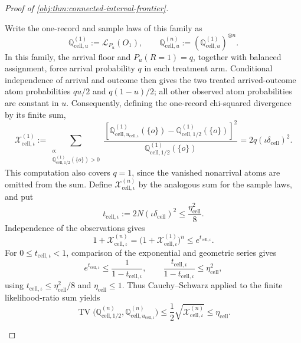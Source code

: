 \documentclass[11pt]{article}
\begin{document}
\begin{proof}[Proof of \cref{obj:thm:connected-interval-frontier}]
\begin{enumerate}
Write the one-record and sample laws of this family as
\[
\mathbb Q_{\mathrm{cell},u}^{(1)}:=\mathcal L_{P_u}(O_1),
\qquad
\mathbb Q_{\mathrm{cell},u}^{(n)}
:=(\mathbb Q_{\mathrm{cell},u}^{(1)})^{\otimes n}.
\]
In this family, the arrival floor and \(P_u(R=1)=q\), together with
balanced assignment, force arrival probability \(q\) in each treatment
arm. Conditional independence of arrival and outcome then gives the
two treated arrived-outcome atom probabilities \(qu/2\) and
\(q(1-u)/2\); all other observed atom probabilities are constant in \(u\).
Consequently, defining the one-record chi-squared divergence by its
finite sum,
\[
\mathcal X_{\mathrm{cell},\iota}^{(1)}
:=
\sum_{\substack{o:\\
\mathbb Q_{\mathrm{cell},1/2}^{(1)}(\{o\})>0}}
\frac{
\left[
\mathbb Q_{\mathrm{cell},u_{\mathrm{cell},\iota}}^{(1)}(\{o\})
-\mathbb Q_{\mathrm{cell},1/2}^{(1)}(\{o\})
\right]^2}
{\mathbb Q_{\mathrm{cell},1/2}^{(1)}(\{o\})}
=
2q(\iota\delta_{\mathrm{cell}})^2.
\]
This computation also covers \(q=1\), since the vanished nonarrival
atoms are omitted from the sum. Define
\(\mathcal X_{\mathrm{cell},\iota}^{(n)}\) by the analogous sum for the
sample laws, and put
\[
t_{\mathrm{cell},\iota}
:=2N(\iota\delta_{\mathrm{cell}})^2
\le\frac{\eta_{\mathrm{cell}}^2}{8}.
\]
Independence of the observations gives
\[
1+\mathcal X_{\mathrm{cell},\iota}^{(n)}
=
\bigl(1+\mathcal X_{\mathrm{cell},\iota}^{(1)}\bigr)^n
\le e^{t_{\mathrm{cell},\iota}}.
\]
For \(0\le t_{\mathrm{cell},\iota}<1\), comparison of the exponential
and geometric series gives
\[
e^{t_{\mathrm{cell},\iota}}
\le\frac1{1-t_{\mathrm{cell},\iota}},
\qquad
\frac{t_{\mathrm{cell},\iota}}{1-t_{\mathrm{cell},\iota}}
\le\eta_{\mathrm{cell}}^2,
\]
using \(t_{\mathrm{cell},\iota}\le\eta_{\mathrm{cell}}^2/8\) and
\(\eta_{\mathrm{cell}}\le1\). Thus Cauchy--Schwarz applied to the
finite likelihood-ratio sum yields
\[
\operatorname{TV}
\bigl(\mathbb Q_{\mathrm{cell},1/2}^{(n)},
      \mathbb Q_{\mathrm{cell},u_{\mathrm{cell},\iota}}^{(n)}\bigr)
\le\frac12\sqrt{\mathcal X_{\mathrm{cell},\iota}^{(n)}}
\le\eta_{\mathrm{cell}}.
\]


\end{enumerate}
\end{proof}
\end{document}
